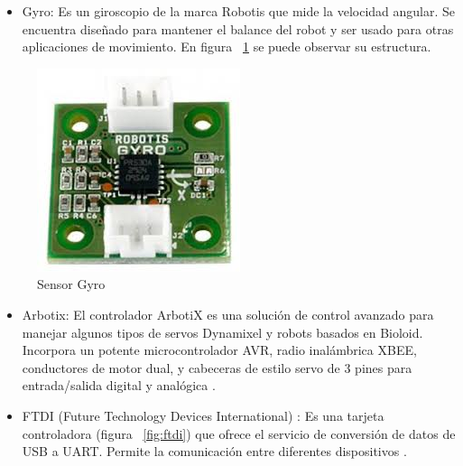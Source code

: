 \begin{itemize}
\item Gyro: Es un giroscopio de la marca Robotis que mide la velocidad angular. Se encuentra diseñado para mantener el balance del robot y ser usado para otras aplicaciones de movimiento\cite{gyro}. En figura ~\ref{fig:gyro} se puede observar su estructura.  

\end{itemize}

\begin{figure}[hbtp]
\centering
\includegraphics[scale=0.35]{imagenes/gyro.jpg}
\caption{Sensor Gyro}
\label{fig:gyro}
\end{figure}

\begin{itemize}
\item Arbotix: El controlador ArbotiX es una solución de control avanzado para manejar algunos tipos de servos Dynamixel y robots
basados en Bioloid. Incorpora un potente microcontrolador AVR, radio inalámbrica XBEE, conductores de motor dual, y cabeceras
de estilo servo de 3 pines para entrada/salida digital y analógica \cite{arbotix}.

\end{itemize}


\begin{itemize}
\item FTDI (Future Technology Devices International) : Es una tarjeta controladora  (figura ~\ref{fig:ftdi}) que ofrece el servicio de conversión de  datos de USB a UART. Permite la comunicación entre diferentes dispositivos \cite{ftdi}.

\end{itemize}

